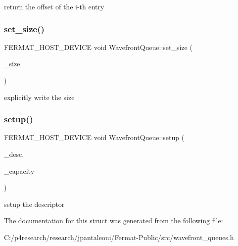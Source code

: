 return the offset of the i-\/th entry \mbox{\label{struct_wavefront_queue_a460794255be37c42cace2c69422f19b1}} 
\subsubsection{\texorpdfstring{set\+\_\+size()}{set\_size()}}
{\footnotesize\ttfamily F\+E\+R\+M\+A\+T\+\_\+\+H\+O\+S\+T\+\_\+\+D\+E\+V\+I\+CE void Wavefront\+Queue\+::set\+\_\+size (\begin{DoxyParamCaption}\item[{const uint32}]{\+\_\+size }\end{DoxyParamCaption})\hspace{0.3cm}{\ttfamily [inline]}}

explicitly write the size \mbox{\label{struct_wavefront_queue_a36ce24d3826d182bce55280ddb4326c2}} 
\subsubsection{\texorpdfstring{setup()}{setup()}}
{\footnotesize\ttfamily F\+E\+R\+M\+A\+T\+\_\+\+H\+O\+S\+T\+\_\+\+D\+E\+V\+I\+CE void Wavefront\+Queue\+::setup (\begin{DoxyParamCaption}\item[{const \hyperlink{struct_queue_descriptor}{Queue\+Descriptor} \&}]{\+\_\+desc,  }\item[{const uint32}]{\+\_\+capacity }\end{DoxyParamCaption})\hspace{0.3cm}{\ttfamily [inline]}}

setup the descriptor 

The documentation for this struct was generated from the following file\+:\begin{DoxyCompactItemize}
\item 
C\+:/p4research/research/jpantaleoni/\+Fermat-\/\+Public/src/wavefront\+\_\+queues.\+h\end{DoxyCompactItemize}
